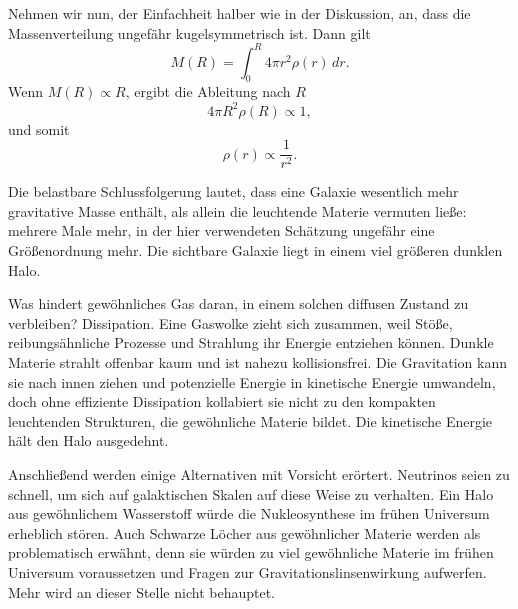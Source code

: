 Nehmen wir nun, der Einfachheit halber wie in der Diskussion, an, dass die Massenverteilung ungefähr kugelsymmetrisch ist. Dann gilt
\begin{equation}
M(R)=\int_0^R 4\pi r^2\rho(r)\,dr.
\end{equation}
Wenn \(M(R)\propto R\), ergibt die Ableitung nach \(R\)
\begin{equation}
4\pi R^2\rho(R)\propto 1,
\end{equation}
und somit
\begin{equation}
\rho(r)\propto \frac{1}{r^2}.
\end{equation}

\begin{classroomqa}\end{classroomqa}

Die belastbare Schlussfolgerung lautet, dass eine Galaxie wesentlich mehr gravitative Masse enthält, als allein die leuchtende Materie vermuten ließe: mehrere Male mehr, in der hier verwendeten Schätzung ungefähr eine Größenordnung mehr. Die sichtbare Galaxie liegt in einem viel größeren dunklen Halo.

Was hindert gewöhnliches Gas daran, in einem solchen diffusen Zustand zu verbleiben? Dissipation. Eine Gaswolke zieht sich zusammen, weil Stöße, reibungsähnliche Prozesse und Strahlung ihr Energie entziehen können. Dunkle Materie strahlt offenbar kaum und ist nahezu kollisionsfrei. Die Gravitation kann sie nach innen ziehen und potenzielle Energie in kinetische Energie umwandeln, doch ohne effiziente Dissipation kollabiert sie nicht zu den kompakten leuchtenden Strukturen, die gewöhnliche Materie bildet. Die kinetische Energie hält den Halo ausgedehnt.

Anschließend werden einige Alternativen mit Vorsicht erörtert. Neutrinos seien zu schnell, um sich auf galaktischen Skalen auf diese Weise zu verhalten. Ein Halo aus gewöhnlichem Wasserstoff würde die Nukleosynthese im frühen Universum erheblich stören. Auch Schwarze Löcher aus gewöhnlicher Materie werden als problematisch erwähnt, denn sie würden zu viel gewöhnliche Materie im frühen Universum voraussetzen und Fragen zur Gravitationslinsenwirkung aufwerfen. Mehr wird an dieser Stelle nicht behauptet.

